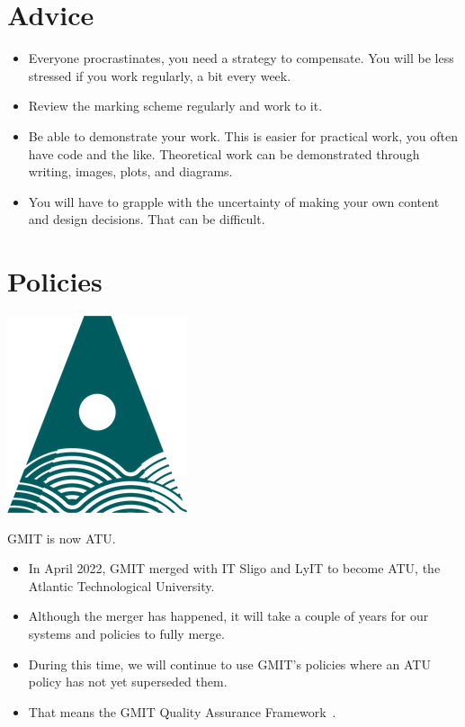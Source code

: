\documentclass[a4paper]{tufte-handout}
\begin{document}
\section{Advice}

\begin{itemize}
  \item Everyone procrastinates, you need a strategy to compensate. You will be less stressed if you work regularly, a bit every week.
  \item Review the marking scheme regularly and work to it.
  \item Be able to demonstrate your work. This is easier for practical work, you often have code and the like. Theoretical work can be demonstrated through writing, images, plots, and diagrams.
  \item You will have to grapple with the uncertainty of making your own content and design decisions. That can be difficult.
\end{itemize}


\section{Policies}

\begin{marginfigure}%
  \centering
  \includegraphics[width=0.6\linewidth]{img/atu-green.png}
  \caption*{GMIT is now ATU.}
  \label{fig:atulogo}
\end{marginfigure}

\begin{itemize}
  \item In April 2022, GMIT merged with IT Sligo and LyIT to become ATU, the Atlantic Technological University.
  \item Although the merger has happened, it will take a couple of years for our systems and policies to fully merge.
  \item During this time, we will continue to use GMIT's policies where an ATU policy has not yet superseded them.
  \item That means the GMIT Quality Assurance Framework~\cite{gmitqaf}.
\end{itemize} 



\end{document}
